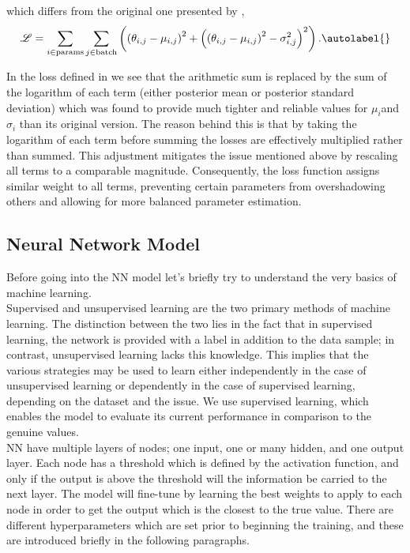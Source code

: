 which differs from the original one presented by \cite{jeffrey2020solvinghighdimensionalparameterinference},
\begin{equation}
    \mathcal{L} = \sum_{i \in \text{params}} \sum_{j \in \text{batch}} \left( \left(\theta_{i, j} - \mu_{i, j}\right)^2 + \left( \left(\theta_{i, j} - \mu_{i, j}\right)^2 - \sigma_{i, j}^2 \right)^2 \right) . \autolabel{}
\end{equation}

In the loss defined in \cite{Villaescusa_Navarro_2020} we see that the arithmetic sum is replaced by the sum of the logarithm of each term (either posterior mean or posterior standard deviation) which was found to provide much tighter and reliable values for $ \mu_{i} $and $ \sigma_i $ than its original version. The reason behind this is that by taking the logarithm of each term before summing the losses are effectively multiplied rather than summed. This adjustment mitigates the issue mentioned above by rescaling all terms to a comparable magnitude. Consequently, the loss function assigns similar weight to all terms, preventing certain parameters from overshadowing others and allowing for more balanced parameter estimation.

\subsection{Neural Network Model}

Before going into the NN model let's briefly try to understand the very basics of machine learning.\\

Supervised and unsupervised learning are the two primary methods of machine learning. The distinction between the two lies in the fact that in supervised learning, the network is provided with a label in addition to the data sample; in contrast, unsupervised learning lacks this knowledge. This implies that the various strategies may be used to learn either independently in the case of unsupervised learning or dependently in the case of supervised learning, depending on the dataset and the issue. We use supervised learning, which enables the model to evaluate its current performance in comparison to the genuine values. \\
NN have multiple layers of nodes; one input, one or many hidden, and one output layer. Each node has a threshold which is defined by the activation function, and only if the output is above the threshold will the information be carried to the next layer. The model will fine-tune by learning the best weights to apply to each node in order to get the output which is the closest to the true value. There are different hyperparameters which are set prior to beginning the training, and these are introduced briefly in the following paragraphs. 

